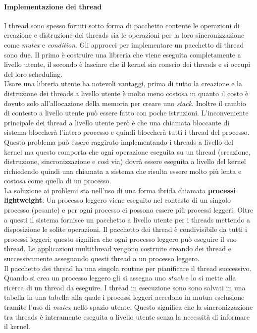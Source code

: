 \paragraph{Implementazione dei thread}
I thread sono spesso forniti sotto forma di pacchetto contente le operazioni di creazione e distruzione dei threads sia le operazioni per la loro sincronizzazione come \emph{mutex} e \emph{condition}. Gli approcci per implementare un pacchetto di thread sono due. Il primo è costruire una libreria che viene eseguita completamente a livello utente, il secondo è lasciare che il kernel sia conscio dei threads e si occupi del loro scheduling.\\
Usare una libreria utente ha notevoli vantaggi, prima di tutto la creazione e la distruzione dei threads a livello utente è molto meno costosa in quanto il costo è dovuto solo all'allocazione della memoria per creare uno \emph{stack}. Inoltre il cambio di contesto a livello utente può essere fatto con poche istruzioni. L'inconveniente principale dei thread a livello utente però è che una chiamata bloccante di sistema bloccherà l'intero processo e quindi bloccherà tutti i thread del processo.\\
Questo problema può essere raggirato implementando i threads a livello del kernel ma questo comporta che ogni operazione eseguita su un thread (creazione, distruzione, sincronizzazione e così via) dovrà essere eseguita a livello del kernel richiedendo quindi una chiamata a sistema che risulta essere molto più lenta e costosa come quella di un processo.\\
La soluzione ai problemi sta nell'uso di una forma ibrida chiamata \textbf{processi lightweight}. Un processo leggero viene eseguito nel contesto di un singolo processo (pesante) e per ogni processo ci possono essere più processi leggeri. Oltre a questi il sistema fornisce un pacchetto a livello utente per i threads mettendo a disposizione le solite operazioni. Il pacchetto dei thread è condivisibile da tutti i processi leggeri; questo significa che ogni processo leggero può eseguire il suo thread. Le applicazioni multithread vengono costruite creando dei thread e successivamente assegnando questi thread a un processo leggero.\\
Il pacchetto dei thread ha una singola routine per pianificare il thread successivo. Quando si crea un processo leggero gli si assegna uno \emph{stack} e lo si mette alla ricerca di un thread da eseguire. I thread in esecuzione sono sono salvati in una tabella in una tabella alla quale i processi leggeri accedono in mutua esclusione tramite l'uso di \emph{mutex} nello spazio utente. Questo significa che la sincronizzazione tra threads è interamente eseguita a livello utente senza la necessità di informare il kernel. \\
